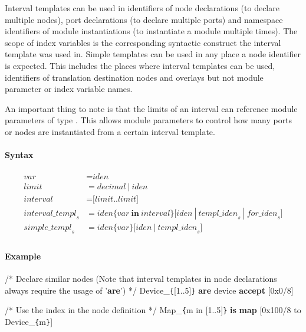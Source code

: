 \documentclass[a4paper,11pt,twoside]{report}
\begin{document}
{{{Interval templates can be used in identifiers of node declarations (to declare multiple nodes), port declarations (to declare multiple ports) and namespace identifiers of module instantiations (to instantiate a module multiple times).
The scope of index variables is the corresponding syntactic construct the interval template was used in.
Simple templates can be used in any place a node identifier is expected.
This includes the places where interval templates can be used, identifiers of translation destination nodes and overlays but not module parameter or index variable names.

An important thing to note is that the limits of an interval can reference module parameters of type .
This allows module parameters to control how many ports or nodes are instantiated from a certain interval template.

\paragraph{Syntax}
\begin{align*}
    \textit{var} & \mathop{=}
        \textit{iden}\\
    \textit{limit} & \mathop{=}
        \textit{decimal}\ |\ \textit{iden} \\
    \textit{interval} & \mathop{=}
        \textbf{[}\textit{limit}\textbf{..}\textit{limit}\textbf{]}\\
    \textit{interval\_templ}_s & \mathop{=}
        \textit{iden}\textbf{\{}\textit{var}\ \textbf{in}\ \textit{interval}\textbf{\}}
        \Big[
            \textit{iden}\ |\ \textit{templ\_iden}_s\ |\ \textit{for\_iden}_s
        \Big]\\
    \textit{simple\_templ}_s & \mathop{=}
        \textit{iden}\textbf{\{}\textit{var}\textbf{\}}\Big[\textit{iden}\ |\ \textit{templ\_iden}_s\Big]\\
\end{align*}

\paragraph{Example}
\begin{syntax}
    /* Declare similar nodes
       (Note that interval templates in node declarations
       always require the usage of '\textbf{are}') */
    Device_\verb+{+[1..5]\verb+}+ \textbf{are} device \textbf{accept} [0x0/8]

    /* Use the index in the node definition */
    Map_\verb+{+m in [1..5]\verb+}+ \textbf{is} \textbf{map} [0x100/8 to Device_\verb+{+m\verb+}+]


\end{syntax}}}}
\end{document}

